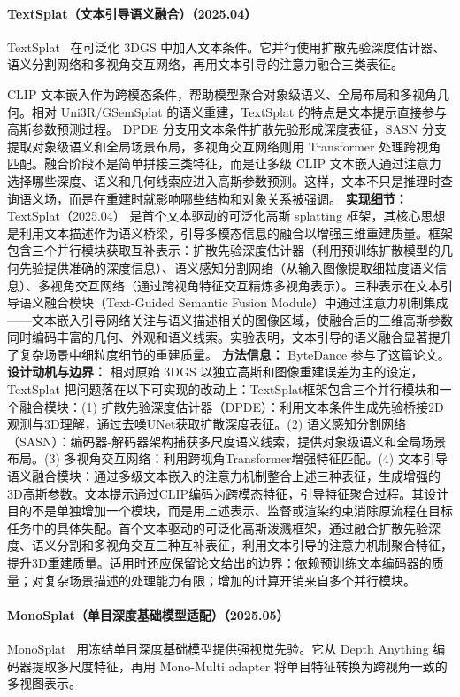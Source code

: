\paragraph{TextSplat（文本引导语义融合）（2025.04）}
TextSplat~\cite{2504_09588} 在可泛化 3DGS 中加入文本条件。它并行使用扩散先验深度估计器、语义分割网络和多视角交互网络，再用文本引导的注意力融合三类表征。

CLIP 文本嵌入作为跨模态条件，帮助模型聚合对象级语义、全局布局和多视角几何。相对 Uni3R/GSemSplat 的语义重建，TextSplat 的特点是文本提示直接参与高斯参数预测过程。
DPDE 分支用文本条件扩散先验形成深度表征，SASN 分支提取对象级语义和全局场景布局，多视角交互网络则用 Transformer 处理跨视角匹配。融合阶段不是简单拼接三类特征，而是让多级 CLIP 文本嵌入通过注意力选择哪些深度、语义和几何线索应进入高斯参数预测。这样，文本不只是推理时查询语义场，而是在重建时就影响哪些结构和对象关系被强调。
\textbf{实现细节：} TextSplat（2025.04） 是首个文本驱动的可泛化高斯 splatting 框架，其核心思想是利用文本描述作为语义桥梁，引导多模态信息的融合以增强三维重建质量。框架包含三个并行模块获取互补表示：扩散先验深度估计器（利用预训练扩散模型的几何先验提供准确的深度信息）、语义感知分割网络（从输入图像提取细粒度语义信息）、多视角交互网络（通过跨视角特征交互精炼多视角表示）。三种表示在文本引导语义融合模块（Text-Guided Semantic Fusion Module）中通过注意力机制集成——文本嵌入引导网络关注与语义描述相关的图像区域，使融合后的三维高斯参数同时编码丰富的几何、外观和语义线索。实验表明，文本引导的语义融合显著提升了复杂场景中细粒度细节的重建质量。
\textbf{方法信息：} ByteDance 参与了这篇论文。
\textbf{设计动机与边界：} 相对原始 3DGS 以独立高斯和图像重建误差为主的设定，TextSplat 把问题落在以下可实现的改动上：TextSplat框架包含三个并行模块和一个融合模块：(1) 扩散先验深度估计器（DPDE）：利用文本条件生成先验桥接2D观测与3D理解，通过去噪UNet获取扩散深度表征。(2) 语义感知分割网络（SASN）：编码器-解码器架构捕获多尺度语义线索，提供对象级语义和全局场景布局。(3) 多视角交互网络：利用跨视角Transformer增强特征匹配。(4) 文本引导语义融合模块：通过多级文本嵌入的注意力机制整合上述三种表征，生成增强的3D高斯参数。文本提示通过CLIP编码为跨模态特征，引导特征聚合过程。其设计目的不是单独增加一个模块，而是用上述表示、监督或渲染约束消除原流程在目标任务中的具体失配。首个文本驱动的可泛化高斯泼溅框架，通过融合扩散先验深度、语义分割和多视角交互三种互补表征，利用文本引导的注意力机制聚合特征，提升3D重建质量。适用时还应保留论文给出的边界：依赖预训练文本编码器的质量；对复杂场景描述的处理能力有限；增加的计算开销来自多个并行模块。
\paragraph{MonoSplat（单目深度基础模型适配）（2025.05）}
MonoSplat~\cite{2505_15185} 用冻结单目深度基础模型提供强视觉先验。它从 Depth Anything 编码器提取多尺度特征，再用 Mono-Multi adapter 将单目特征转换为跨视角一致的多视图表示。

